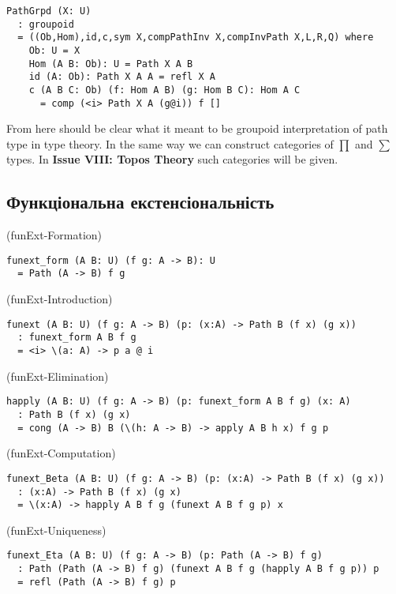 \begin{lstlisting}
PathGrpd (X: U)
  : groupoid
  = ((Ob,Hom),id,c,sym X,compPathInv X,compInvPath X,L,R,Q) where
    Ob: U = X
    Hom (A B: Ob): U = Path X A B
    id (A: Ob): Path X A A = refl X A
    c (A B C: Ob) (f: Hom A B) (g: Hom B C): Hom A C
      = comp (<i> Path X A (g@i)) f []
\end{lstlisting}
From here should be clear what it meant to be groupoid interpretation
of path type in type theory. In the same way we can construct categories of $\prod$ and $\sum$ types.
In {\textbf{Issue VIII: Topos Theory}} such categories will be given.

\subsection{Функціональна екстенсіональність}

\begin{definition} (funExt-Formation)
\begin{lstlisting}
funext_form (A B: U) (f g: A -> B): U
  = Path (A -> B) f g
\end{lstlisting}
\end{definition}

\begin{definition} (funExt-Introduction)
\begin{lstlisting}
funext (A B: U) (f g: A -> B) (p: (x:A) -> Path B (f x) (g x))
  : funext_form A B f g
  = <i> \(a: A) -> p a @ i
\end{lstlisting}
\end{definition}

\begin{definition} (funExt-Elimination)
\begin{lstlisting}
happly (A B: U) (f g: A -> B) (p: funext_form A B f g) (x: A)
  : Path B (f x) (g x)
  = cong (A -> B) B (\(h: A -> B) -> apply A B h x) f g p
\end{lstlisting}
\end{definition}

\begin{definition} (funExt-Computation)
\begin{lstlisting}
funext_Beta (A B: U) (f g: A -> B) (p: (x:A) -> Path B (f x) (g x))
  : (x:A) -> Path B (f x) (g x)
  = \(x:A) -> happly A B f g (funext A B f g p) x
\end{lstlisting}
\end{definition}

\begin{definition} (funExt-Uniqueness)
\begin{lstlisting}
funext_Eta (A B: U) (f g: A -> B) (p: Path (A -> B) f g)
  : Path (Path (A -> B) f g) (funext A B f g (happly A B f g p)) p
  = refl (Path (A -> B) f g) p
\end{lstlisting}
\end{definition}

